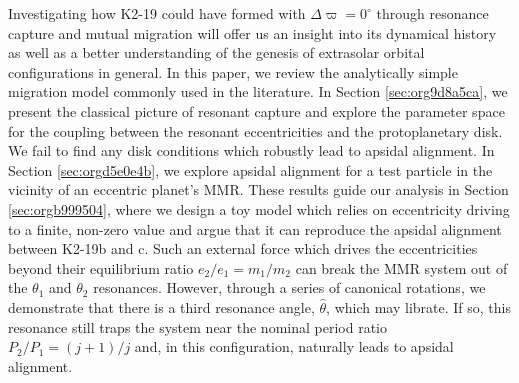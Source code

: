 \documentclass[usenatbib,twocolumn]{mnras}
\begin{document}
Investigating how K2-19 could have formed with \(\Delta\varpi=0^\circ\)
through resonance capture and mutual migration will offer us an
insight into its dynamical history as well as a better understanding
of the genesis of extrasolar orbital configurations in general.  In
this paper, we review the analytically simple migration model commonly
used in the literature.  In Section \ref{sec:org9d8a5ca}, we present the classical picture of resonant capture and
explore the parameter space for the coupling between the resonant
eccentricities and the protoplanetary disk. We fail to find any disk
conditions which robustly lead to apsidal alignment.  In Section \ref{sec:orgd5e0e4b},
we explore apsidal alignment for a test particle in the vicinity of an
eccentric planet's MMR. These results guide our analysis in Section
\ref{sec:orgb999504}, where we design a toy model which relies on
eccentricity driving to a finite, non-zero value and argue that it can
reproduce the apsidal alignment between K2-19b and c.  Such an
external force which drives the eccentricities beyond their
equilibrium ratio \(e_2/e_1 = m_1/m_2\) can break the MMR system out of
the \(\theta_1\) and \(\theta_2\) resonances.  However, through a series
of canonical rotations, we demonstrate that there is a third resonance
angle, \(\hat\theta\), which may librate.  If so, this resonance still
traps the system near the nominal period ratio \(P_2/P_1=(j+1)/j\) and,
in this configuration, naturally leads to apsidal alignment.
\end{document}
